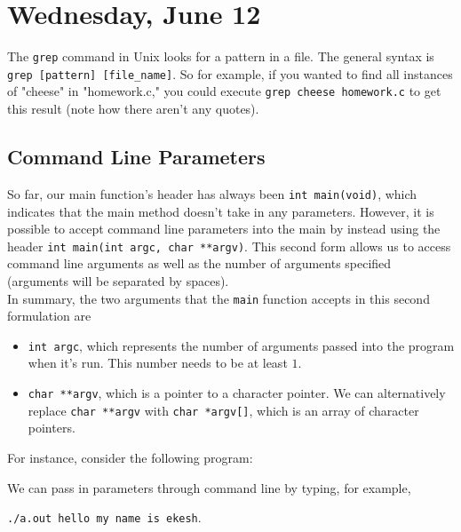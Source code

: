 \section{Wednesday, June 12}

The \verb!grep! command in Unix looks for a pattern in a file. The general syntax is \verb!grep [pattern] [file_name]!. So for example, if you wanted to find all instances of "cheese" in "homework.c," you could execute \verb!grep cheese homework.c! to get this result (note how there aren't any quotes). 

\subsection{Command Line Parameters}

So far, our main function's header has always been \texttt{int main(void)}, which indicates that the main method doesn't take in any parameters. However, it is possible to accept command line parameters into the main by instead using the header \texttt{int main(int argc, char **argv)}. This second form allows us to access command line arguments as well as the number of arguments specified (arguments will be separated by spaces). \\

In summary, the two arguments that the \texttt{main} function accepts in this second formulation are \begin{itemize}
    \item \texttt{int argc}, which represents the number of arguments passed into the program when it's run. This number needs to be at least $1$.
    \item \texttt{char **argv}, which is a pointer to a character pointer. We can alternatively replace \texttt{char **argv} with \texttt{char *argv[]}, which is an array of character pointers. 
\end{itemize}

For instance, consider the following program:


\lstset{
caption=Command Line Parameters
}
\begin{center}
\label{Command Line Parameters}
\end{center}


We can pass in parameters through command line by typing, for example, 
\begin{center}
\texttt{./a.out hello my name is ekesh}. 
\end{center}


